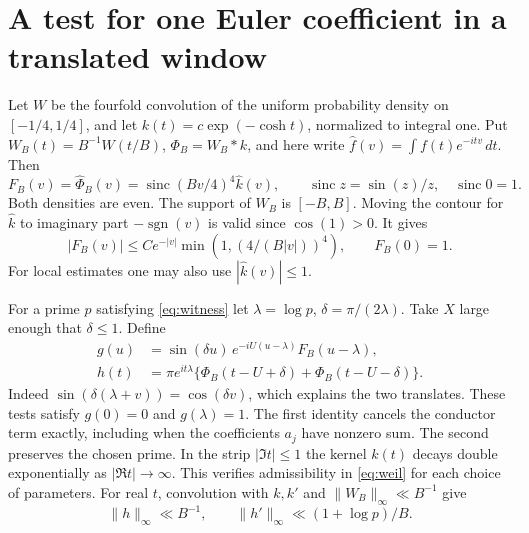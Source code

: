 \documentclass[11pt]{article}
\newcommand{\dd}{\,d}\newcommand{\supp}{\operatorname{supp}}
\newcommand{\sinc}{\operatorname{sinc}}\newcommand{\ord}{\operatorname{ord}}
\begin{document}
\section{A test for one Euler coefficient in a translated window}
Let \(W\) be the fourfold convolution of the uniform probability density on \([-1/4,1/4]\), and let \(k(t)=c\exp(-\cosh t)\), normalized to integral one. Put \(W_B(t)=B^{-1}W(t/B)\), \(\Phi_B=W_B*k\), and here write \(\widehat f(v)=\int f(t)e^{-itv}\dd t\). Then
\[
 F_B(v)=\widehat\Phi_B(v)=\sinc(Bv/4)^4\widehat k(v),\qquad
 \sinc z=\sin(z)/z,\quad \sinc 0=1.
\]
Both densities are even. The support of \(W_B\) is \([-B,B]\). Moving the contour for \(\widehat k\) to imaginary part \(-\operatorname{sgn}(v)\) is valid since \(\cos(1)>0\). It gives
\begin{equation}\label{eq:F}
 |F_B(v)|\le C e^{-|v|}\min(1,(4/(B|v|))^4),\qquad F_B(0)=1.
\end{equation}
For local estimates one may also use \(|\widehat k(v)|\le1\).

For a prime \(p\) satisfying \eqref{eq:witness} let \(\lambda=\log p\), \(\delta=\pi/(2\lambda)\). Take \(X\) large enough that \(\delta\le1\). Define
\begin{align}
 g(u)&=\sin(\delta u)\,e^{-iU(u-\lambda)} F_B(u-\lambda),\label{eq:g}\\
 h(t)&=\pi e^{it\lambda}\{\Phi_B(t-U+\delta)+\Phi_B(t-U-\delta)\}.
 \label{eq:h}
\end{align}
Indeed \(\sin(\delta(\lambda+v))=\cos(\delta v)\), which explains the two translates. These tests satisfy \(g(0)=0\) and \(g(\lambda)=1\). The first identity cancels the conductor term exactly, including when the coefficients \(a_j\) have nonzero sum. The second preserves the chosen prime. In the strip \(|\Im t|\le1\) the kernel \(k(t)\) decays double exponentially as \(|\Re t|\to\infty\). This verifies admissibility in \eqref{eq:weil} for each choice of parameters.
For real \(t\), convolution with \(k,k'\) and \(\|W_B\|_\infty\ll B^{-1}\) give
\begin{equation}\label{eq:sup}
 \|h\|_\infty\ll B^{-1},\qquad
 \|h'\|_\infty\ll (1+\log p)/B.
\end{equation}
\end{document}
